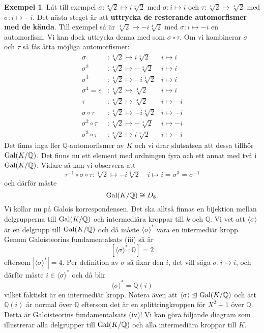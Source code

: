 \documentclass{article}
\newcommand{\gal}[0]{\textnormal{Gal}}
\theoremstyle{definition}
\newtheorem{exmp}[thm]{Exempel}
\begin{document}
\begin{exmp}
  Låt till exempel 
  $\sigma: \sqrt[4]{2} \mapsto i \sqrt[4]{2}$ med $\sigma: i \mapsto i$ och $\tau: \sqrt[4]{2} \mapsto \sqrt[4]{2}$ med $\sigma: i \mapsto -i$.
  Det nästa steget är att \textbf{uttrycka de resterande automorfismer med de kända}. Till exempel så är $\sqrt[4]{2} \mapsto -i\sqrt[4]{2}$ med 
  $\sigma: i \mapsto -i$ en automorfism. Vi kan dock uttrycka denna med som $\sigma \circ\tau$. Om vi kombinerar $\sigma$ och $\tau$ så fås 
  åtta möjliga automorfismer: 
  \begin{align*}
    \sigma &: \sqrt[4]{2} \mapsto i\sqrt[4]{2}        & i \mapsto i \\
    \sigma^2 &: \sqrt[4]{2} \mapsto -\sqrt[4]{2}  & i \mapsto i \\
    \sigma^3 &: \sqrt[4]{2} \mapsto -i\sqrt[4]{2}  & i \mapsto i \\
    \sigma^4  = e &: \sqrt[4]{2} \mapsto \sqrt[4]{2}        & i \mapsto i \\
    \tau &: \sqrt[4]{2} \mapsto \sqrt[4]{2}                 & i \mapsto -i \\
    \sigma \circ \tau &: \sqrt[4]{2} \mapsto -i\sqrt[4]{2}  & i \mapsto -i \\
    \sigma^2 \circ \tau &: \sqrt[4]{2} \mapsto -\sqrt[4]{2} & i \mapsto -i \\
    \sigma^3 \circ \tau &: \sqrt[4]{2} \mapsto i\sqrt[4]{2} & i \mapsto -i
  \end{align*}
  Det finns inga fler $\mathbb{Q}$-automorfismer av $K$ och vi drar slutsatsen att dessa tillhör $\gal(K/\mathbb{Q})$. 
  Det finns nu ett element med ordningen fyra och ett annat med två i $\gal(K/\mathbb{Q})$. Vidare så kan vi observera att 
  \[\tau^{-1} \circ \sigma \circ \tau: \sqrt[4]{2} \mapsto -i\sqrt[4]{2} \quad i \mapsto i = \sigma^3 = \sigma^{-1}\]
  och därför måste 
  \[\gal(K/\mathbb{Q}) \cong D_8.\]
  Vi kollar nu på Galois korrespondensen. Det ska alltså finnas en bijektion mellan delgrupperna till $\gal(K/\mathbb{Q})$ och intermediära kroppar till $k$
  och $\mathbb{Q}$. Vi vet att $\langle \sigma \rangle$ är en delgrupp till $\gal(K/\mathbb{Q})$ och då måste  $\langle \sigma \rangle^*$ vara en 
  intermediär kropp. Genom Galoisteorins fundamentalsats (iii) så är 
  \[ [\langle \sigma \rangle^*: \mathbb{Q}] = 2 \]
  eftersom $|\langle \sigma \rangle^*| = 4$. Per definition av $\sigma$ så fixar den $i$, det vill säga $\sigma: i \mapsto i$, och därför måste
  $i \in \langle \sigma \rangle^*$ och då blir 
  \[\langle \sigma \rangle^* = \mathbb{Q}(i)\]
  vilket faktiskt är en intermediär kropp.
  Notera även att $\langle \sigma \rangle \trianglelefteq \gal(K/\mathbb{Q})$ och att $\mathbb{Q}(i)$ är normal över $\mathbb{Q}$ eftersom 
  det är en splittringkroppen för $X^2 + 1$ över $\mathbb{Q}$. Detta är Galoisteorins fundamentalsats (iv)! Vi kan göra följande diagram som 
  illustrerar alla delgrupper till $\gal(K/\mathbb{Q})$ och alla intermediära kroppar till $K$.


\end{exmp}
\end{document}
